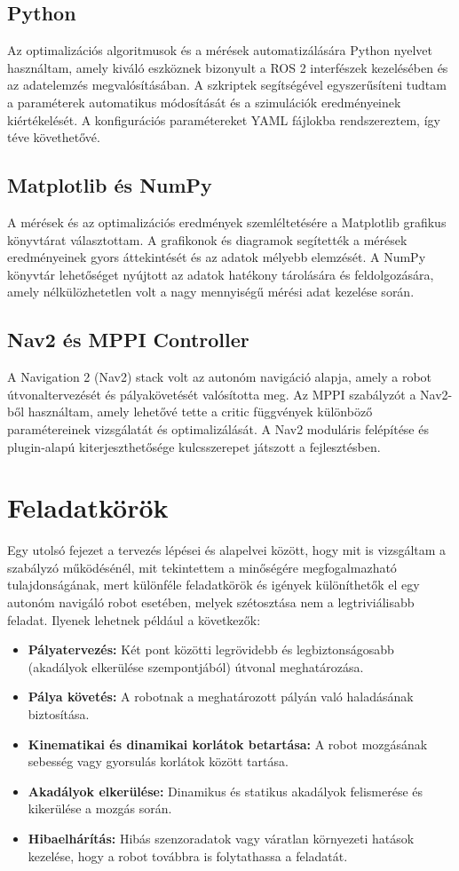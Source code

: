 \subsection{Python}
Az optimalizációs algoritmusok és a mérések automatizálására Python nyelvet használtam, amely kiváló eszköznek bizonyult a ROS 2 interfészek kezelésében és az adatelemzés megvalósításában. A szkriptek segítségével egyszerűsíteni tudtam a paraméterek automatikus módosítását és a szimulációk eredményeinek kiértékelését. A konfigurációs paramétereket YAML fájlokba rendszereztem, így téve követhetővé.

\subsection{Matplotlib és NumPy}
A mérések és az optimalizációs eredmények szemléltetésére a Matplotlib grafikus könyvtárat választottam. A grafikonok és diagramok segítették a mérések eredményeinek gyors áttekintését és az adatok mélyebb elemzését. A NumPy könyvtár lehetőséget nyújtott az adatok hatékony tárolására és feldolgozására, amely nélkülözhetetlen volt a nagy mennyiségű mérési adat kezelése során.

\subsection{Nav2 és MPPI Controller}
A Navigation 2 (Nav2) stack volt az autonóm navigáció alapja, amely a robot útvonaltervezését és pályakövetését valósította meg. Az MPPI szabályzót a Nav2-ből használtam, amely lehetővé tette a critic függvények különböző paramétereinek vizsgálatát és optimalizálását. A Nav2 moduláris felépítése és plugin-alapú kiterjeszthetősége kulcsszerepet játszott a fejlesztésben.

\section{Feladatkörök}
Egy utolsó fejezet a tervezés lépései és alapelvei között, hogy mit is vizsgáltam a szabályzó működésénél, mit tekintettem a minőségére megfogalmazható tulajdonságának, mert különféle feladatkörök és igények különíthetők el egy autonóm navigáló robot esetében, melyek szétosztása nem a legtriviálisabb feladat. Ilyenek lehetnek például a következők:
\begin{itemize}
    \item \textbf{Pályatervezés:} Két pont közötti legrövidebb és legbiztonságosabb (akadályok elkerülése szempontjából) útvonal meghatározása.
    \item \textbf{Pálya követés:} A robotnak a meghatározott pályán való haladásának biztosítása.
    \item \textbf{Kinematikai és dinamikai korlátok betartása:} A robot mozgásának sebesség vagy gyorsulás korlátok között tartása.
    \item \textbf{Akadályok elkerülése:} Dinamikus és statikus akadályok felismerése és kikerülése a mozgás során.
    \item \textbf{Hibaelhárítás:} Hibás szenzoradatok vagy váratlan környezeti hatások kezelése, hogy a robot továbbra is folytathassa a feladatát.
\end{itemize}

